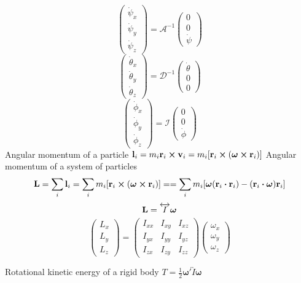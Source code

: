 \documentclass[12pt]{article}
\begin{document}
\[
\begin{pmatrix}
\dot{\psi}_{x}\\
\dot{\psi}_{y}\\
\dot{\psi}_{z}
\end{pmatrix}
=\mathcal{A}^{-1}
\begin{pmatrix}
0\\0\\\dot{\psi}
\end{pmatrix}
\]
\[
\begin{pmatrix}
\dot{\theta}_{x}\\
\dot{\theta}_{y}\\
\dot{\theta}_{z}
\end{pmatrix}
=\mathcal{D}^{-1}
\begin{pmatrix}
\dot{\theta}\\0\\0
\end{pmatrix}
\]
\[
\begin{pmatrix}
\dot{\phi}_{x}\\
\dot{\phi}_{y}\\
\dot{\phi}_{z}
\end{pmatrix}
=\mathcal{I}
\begin{pmatrix}
0\\0\\\dot{\phi}
\end{pmatrix}
\]
Angular momentum of a particle $\vb{l}_i=m_i\vb{r}_i\cp\vb{v}_i=m_i[\vb{r}_i\cp\qty(\bm{\omega}\cp\vb{r}_i)]$
Angular momentum of a system of particles \[\vb{L}=\sum_i\vb{l}_i=\sum_im_i[\vb{r}_i\cp\qty(\bm{\omega}\cp\vb{r}_i)]==\sum_im_i[\bm{\omega}\qty(\vb{r}_i\vdot\vb{r}_i)-\qty(\vb{r}_i\vdot\bm{\omega})\vb{r}_i]\]
\[\vb{L}=\overleftrightarrow{I}\bm{\omega}\]
\[
\begin{pmatrix}
L_x\\L_y\\L_z
\end{pmatrix}
=
\begin{pmatrix}
I_{xx}& I_{xy}& I_{xz}\\
I_{yx}& I_{yy}& I_{yz}\\
I_{zx}& I_{zy}& I_{zz}
\end{pmatrix}
\begin{pmatrix}
\omega_x\\ \omega_y\\ \omega_z
\end{pmatrix}
\]

Rotational kinetic energy of a rigid body $T=\frac{1}{2}\bm{\omega}'\overleftrightarrow{I}\bm{\omega}$
\end{document}

